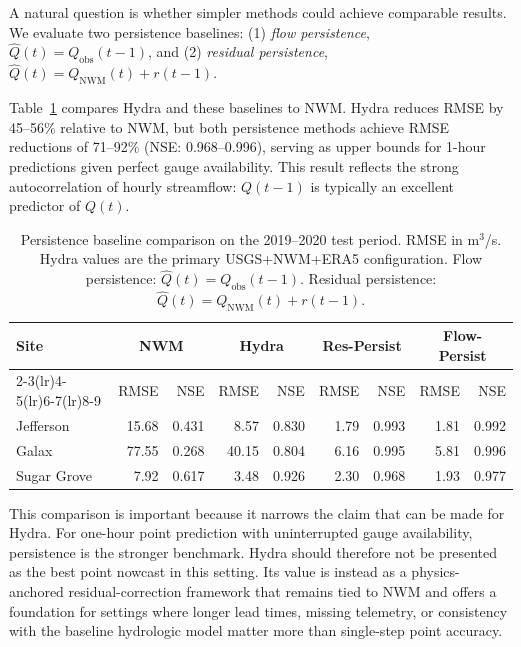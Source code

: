 \documentclass[draft]{agujournal2019}
\begin{document}
A natural question is whether simpler methods could achieve comparable results. We evaluate two persistence baselines: (1) \textit{flow persistence}, $\hat{Q}(t) = Q_{\text{obs}}(t-1)$, and (2) \textit{residual persistence}, $\hat{Q}(t) = Q_{\text{NWM}}(t) + r(t-1)$.

Table~\ref{tab:persistence} compares Hydra and these baselines to NWM. Hydra reduces RMSE by 45--56\% relative to NWM, but both persistence methods achieve RMSE reductions of 71--92\% (NSE: 0.968--0.996), serving as upper bounds for 1-hour predictions given perfect gauge availability. This result reflects the strong autocorrelation of hourly streamflow: $Q(t-1)$ is typically an excellent predictor of $Q(t)$.

\begin{table}
    \centering
    \caption{Persistence baseline comparison on the 2019--2020 test period. RMSE in m$^3$/s. Hydra values are the primary USGS+NWM+ERA5 configuration. Flow persistence: $\hat{Q}(t) = Q_{\text{obs}}(t-1)$. Residual persistence: $\hat{Q}(t) = Q_{\text{NWM}}(t) + r(t-1)$.}
    \small
    \begin{tabular}{l rr rr rr rr}
        \toprule
        \textbf{Site} & \multicolumn{2}{c}{\textbf{NWM}} & \multicolumn{2}{c}{\textbf{Hydra}} & \multicolumn{2}{c}{\textbf{Res-Persist}} & \multicolumn{2}{c}{\textbf{Flow-Persist}} \\
        \cmidrule(lr){2-3}\cmidrule(lr){4-5}\cmidrule(lr){6-7}\cmidrule(lr){8-9}
         & RMSE & NSE & RMSE & NSE & RMSE & NSE & RMSE & NSE \\
        \midrule
        Jefferson   & 15.68 & 0.431 & 8.57 & 0.830 & 1.79 & 0.993 & 1.81 & 0.992 \\
        Galax       & 77.55 & 0.268 & 40.15 & 0.804 & 6.16 & 0.995 & 5.81 & 0.996 \\
        Sugar Grove &  7.92 & 0.617 & 3.48 & 0.926 & 2.30 & 0.968 & 1.93 & 0.977 \\
        \bottomrule
    \end{tabular}
    \label{tab:persistence}
\end{table}

This comparison is important because it narrows the claim that can be made for Hydra. For one-hour point prediction with uninterrupted gauge availability, persistence is the stronger benchmark. Hydra should therefore not be presented as the best point nowcast in this setting. Its value is instead as a physics-anchored residual-correction framework that remains tied to NWM and offers a foundation for settings where longer lead times, missing telemetry, or consistency with the baseline hydrologic model matter more than single-step point accuracy.
\end{document}
